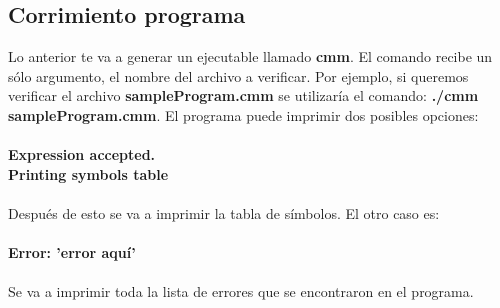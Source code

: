 \documentclass[11pt]{article}
\begin{document}
\subsection{Corrimiento programa}

Lo anterior te va a generar un ejecutable llamado \textbf{cmm}. El comando recibe un sólo argumento, el nombre del archivo a 
verificar. Por ejemplo, si queremos verificar el archivo \textbf{sampleProgram.cmm} se utilizaría el comando: 
\textbf{./cmm sampleProgram.cmm}. El programa puede imprimir dos posibles opciones:
\\\\
\textbf{Expression accepted.}
\\
\textbf{Printing symbols table}
\\\\
Después de esto se va a imprimir la tabla de símbolos. El otro caso es:
\\\\
\textbf{Error: 'error aquí'}
\\\\
Se va a imprimir toda la lista de errores que se encontraron en el programa.
\end{document}
